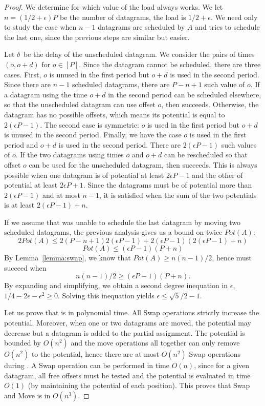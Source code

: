 \begin{proof}
We determine for which value of the load \swapandmove always works. We let $n = (1/2 + \epsilon)P$ be the number of datagrams, the load is $1/2 + \epsilon$. We need only to study the case when $n-1$ datagrams are scheduled by $A$ and \swapandmove tries to schedule the last one, since the previous steps are similar but easier. 

Let $\delta$ be the delay of the unscheduled datagram. We consider the pairs 
of times $(o,o+d)$ for $o \in [P]$. Since the datagram
cannot be scheduled, there are three cases. First, $o$ is unused in the first period but $o+d$ is used in the second period. Since there are $n-1$ scheduled datagrams, there are $P-n+1$ such value of $o$. If a datagram using the time $o+d$ in the second period can be scheduled elsewhere, so that the unscheduled datagram can use offset $o$, then \swapandmove succeeds.
Otherwise, the datagram has no possible offsets, which means its potential is equal to $2(\epsilon P -1)$.
The second case is symmetric: $o$ is used in the first period but $o+d$ is unused in the second period. 
Finally, we have the case $o$ is used in the first period and $o+d$ is used in the second period.  There are $2(\epsilon P -1)$ such values of $o$. If the two datagrams using times 
$o$ and $o+d$ can be rescheduled so that offset $o$ can be used for the unscheduled datagram,
then \swapandmove succeeds. This is always possible when one datagram is of potential at least $2\epsilon P -1$ and the other of potential at least $2\epsilon P + 1$. Since the datagrams must be of potential more than $2(\epsilon P -1)$ and at most $n-1$, it is satisfied when the sum of the two potentials is at least $2(\epsilon P -1) + n$.

If we assume that \swapandmove was unable to schedule the last datagram by moving two scheduled datagrams, the previous analysis gives us a bound on twice $Pot(A)$: 
$$ 2Pot(A) \leq 2(P-n+1) 2(\epsilon P -1) + 2(\epsilon P -1)(2(\epsilon P -1) + n) $$
$$ Pot(A) \leq (\epsilon P -1) (P + n)$$
By Lemma~\ref{lemma:swap}, we know that $Pot(A) \geq n(n-1)/2$, hence 
\swapandmove must succeed when
$$n(n-1)/2 \geq  (\epsilon P -1) (P + n).$$
By expanding and simplifying, we obtain a second degree inequation in $\epsilon$, $1/4 - 2\epsilon - \epsilon ^2 \geq  0$.
Solving this inequation yields $\epsilon \leq \sqrt{5}/2 -1$.


Let us prove that \swapandmove is in polynomial time. All Swap operations 
strictly increase the potential. Moreover, when one or two datagrams are moved, the potential may decrease but
a datagram is added to the partial assignment. The potential is bounded by $O(n^2)$ and the move operations all together can only remove $O(n^2)$ to the potential, hence there are at most $O(n^2)$ Swap operations during \swapandmove. A Swap operation can be performed in time $O(n)$, since for a given datagram, all free offsets must be tested and the potential is evaluated in time $O(1)$ (by maintaining the potential of each position). This proves that Swap and Move is in $O(n^3)$.  
\end{proof}

